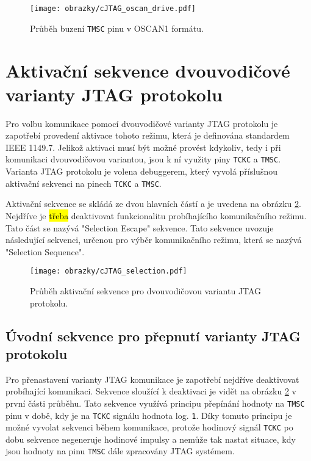 \begin{figure}[!h]
  \begin{center}
    \texttt{[image: obrazky/cJTAG\_oscan\_drive.pdf]}
  \end{center}
  \caption{Průběh buzení \texttt{\acs{TMSC}} pinu v OSCAN1 formátu.}
	\label{fig:oscan_drive}
\end{figure}


\section{Aktivační sekvence dvouvodičové varianty \acs{JTAG} protokolu}
Pro volbu komunikace pomocí dvouvodičové varianty \acs{JTAG} protokolu je zapotřebí provedení aktivace tohoto režimu, která je definována standardem IEEE 1149.7. Jelikož aktivaci musí být možné provést kdykoliv, tedy i při komunikaci dvouvodičovou variantou, jsou k ní využity piny \texttt{\acs{TCKC}} a \texttt{\acs{TMSC}}. Varianta \acs{JTAG} protokolu je volena debuggerem, který vyvolá příslušnou aktivační sekvenci na pinech \texttt{\acs{TCKC}} a \texttt{\acs{TMSC}}. \cite{IEEE_1149-7}

Aktivační sekvence se skládá ze dvou hlavních částí a je uvedena na obrázku \ref{fig:cJTAG_sel}. Nejdříve je \hl{třeba} deaktivovat funkcionalitu probíhajícího komunikačního režimu. Tato část se nazývá "Selection Escape" sekvence. Tato sekvence uvozuje následující sekvenci, určenou pro výběr komunikačního režimu, která se nazývá "Selection Sequence". \cite{IEEE_1149-7}

\begin{figure}[!h]
  \begin{center}
    \texttt{[image: obrazky/cJTAG\_selection.pdf]}
  \end{center}
  \caption{Průběh aktivační sekvence pro dvouvodičovou variantu \acs{JTAG} protokolu.}
	\label{fig:cJTAG_sel}
\end{figure}

\subsection{Úvodní sekvence pro přepnutí varianty \acs{JTAG} protokolu}	\label{subsec:sel_escape}
Pro přenastavení varianty \acs{JTAG} komunikace je zapotřebí nejdříve deaktivovat probíhající komunikaci. Sekvence sloužící k deaktivaci je vidět na obrázku \ref{fig:cJTAG_sel} v první části průběhu. Tato sekvence využívá principu přepínání hodnoty na \texttt{\acs{TMSC}} pinu v době, kdy je na \texttt{\acs{TCKC}} signálu hodnota log. \texttt{1}. Díky tomuto principu je možné vyvolat sekvenci během komunikace, protože hodinový signál \texttt{\acs{TCKC}} po dobu sekvence negeneruje hodinové impulsy a nemůže tak nastat situace, kdy jsou hodnoty na pinu \texttt{\acs{TMSC}} dále zpracovány \acs{JTAG} systémem. \cite{IEEE_1149-7}

